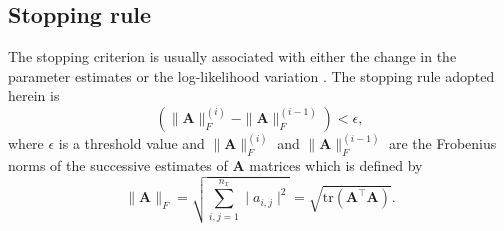 \documentclass[review,authoryear,3p]{elsarticle}
\begin{document}
\subsection{Stopping rule}
The stopping criterion is usually associated with either the change in the parameter estimates or the log-likelihood variation \cite{McLachlan1997}. The stopping rule adopted herein is
\begin{equation}
 \left(\parallel \mathbf{A} \parallel_{F}^{(i)}-\parallel \mathbf{A} \parallel_{F}^{(i-1)}\right)<\epsilon,
 \end{equation}
 where $\epsilon$ is a threshold value and $\parallel \mathbf{A} \parallel_{F}^{(i)}$ and $ \parallel \mathbf{A} \parallel_{F}^{(i-1)}$ are the Frobenius norms  of the successive estimates of $\mathbf{A} $ matrices which is defined by \citet{Meyer2000}
 \begin{equation}
  \parallel \mathbf{A} \parallel_{F}=\sqrt{\sum_{i,j=1}^{n_x}\mid a_{i,j} \mid^2}=\sqrt{\mathrm{tr} (\mathbf A^{\top}\mathbf A)}.
 \end{equation}
\end{document}

